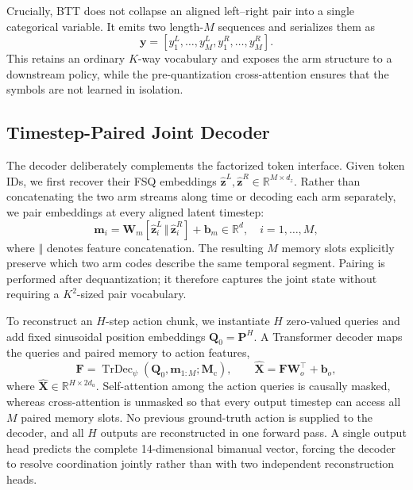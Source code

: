 Crucially, BTT does not collapse an aligned left--right pair into a single
categorical variable.  It emits two length-$M$ sequences and serializes them as
\begin{equation}
    \mathbf{y}
    = [y^{L}_{1},\ldots,y^{L}_{M},
       y^{R}_{1},\ldots,y^{R}_{M}].
    \label{eq:btt_serialization}
\end{equation}
This retains an ordinary $K$-way vocabulary and exposes the arm structure to a
downstream policy, while the pre-quantization cross-attention ensures that the
symbols are not learned in isolation.

\subsection{Timestep-Paired Joint Decoder}
\label{sec:btt_decoder}

The decoder deliberately complements the factorized token interface.  Given
token IDs, we first recover their FSQ embeddings
$\widehat{\mathbf{z}}^{L},\widehat{\mathbf{z}}^{R}
\in\mathbb{R}^{M\times d_z}$.  Rather than concatenating the two arm streams
along time or decoding each arm separately, we pair embeddings at every
aligned latent timestep:
\begin{equation}
    \mathbf{m}_{i}
    = \mathbf{W}_{m}
      [\widehat{\mathbf{z}}^{L}_{i}\,\Vert\,
       \widehat{\mathbf{z}}^{R}_{i}]
      +\mathbf{b}_{m}
    \in\mathbb{R}^{d},
    \quad i=1,\ldots,M,
    \label{eq:btt_paired_memory}
\end{equation}
where $\Vert$ denotes feature concatenation.  The resulting $M$ memory slots
explicitly preserve which two arm codes describe the same temporal segment.
Pairing is performed after dequantization; it therefore captures the joint
state without requiring a $K^2$-sized pair vocabulary.

To reconstruct an $H$-step action chunk, we instantiate $H$ zero-valued queries
and add fixed sinusoidal position embeddings
$\mathbf{Q}_{0}=\mathbf{P}^{H}$.  A Transformer decoder maps the queries and
paired memory to action features,
\begin{equation}
    \mathbf{F}
    = \operatorname{TrDec}_{\psi}
      (\mathbf{Q}_{0},\mathbf{m}_{1:M};\mathbf{M}_{\mathrm{c}}),
    \qquad
    \widehat{\mathbf{X}}
    = \mathbf{F}\mathbf{W}_{o}^{\top}+\mathbf{b}_{o},
    \label{eq:btt_decode}
\end{equation}
where $\widehat{\mathbf{X}}\in\mathbb{R}^{H\times 2d_a}$.  Self-attention among
the action queries is causally masked, whereas cross-attention is unmasked so
that every output timestep can access all $M$ paired memory slots.  No previous
ground-truth action is supplied to the decoder, and all $H$ outputs are
reconstructed in one forward pass.  A single output head predicts the complete
14-dimensional bimanual vector, forcing the decoder to resolve coordination
jointly rather than with two independent reconstruction heads.

